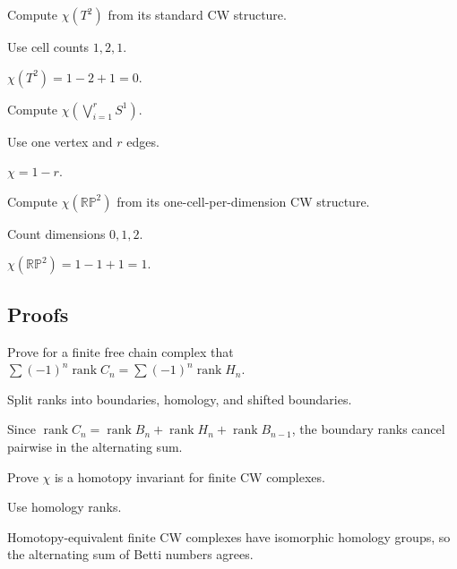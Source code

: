 \begin{exercise}[Torus]\label{exr:viii21-ped-03}
Compute $\chi(T^2)$ from its standard CW structure.
\end{exercise}
\begin{hint}
Use cell counts $1,2,1$.
\end{hint}
\begin{solution}
$\chi(T^2)=1-2+1=0$.
\end{solution}

\begin{exercise}\label{exr:viii21-ped-04}
Compute $\chi(\bigvee_{i=1}^r S^1)$.
\end{exercise}
\begin{hint}
Use one vertex and $r$ edges.
\end{hint}
\begin{solution}
$\chi=1-r$.
\end{solution}

\begin{exercise}\label{exr:viii21-ped-05}
Compute $\chi(\mathbb{RP}^2)$ from its one-cell-per-dimension CW structure.
\end{exercise}
\begin{hint}
Count dimensions $0,1,2$.
\end{hint}
\begin{solution}
$\chi(\mathbb{RP}^2)=1-1+1=1$.
\end{solution}

\subsection*{Proofs}

\begin{exercise}\label{exr:viii21-ped-06}
Prove for a finite free chain complex that $\sum(-1)^n\operatorname{rank}C_n=\sum(-1)^n\operatorname{rank}H_n$.
\end{exercise}
\begin{hint}
Split ranks into boundaries, homology, and shifted boundaries.
\end{hint}
\begin{solution}
Since $\operatorname{rank}C_n=\operatorname{rank}B_n+\operatorname{rank}H_n+\operatorname{rank}B_{n-1}$, the boundary ranks cancel pairwise in the alternating sum.
\end{solution}

\begin{exercise}\label{exr:viii21-ped-07}
Prove $\chi$ is a homotopy invariant for finite CW complexes.
\end{exercise}
\begin{hint}
Use homology ranks.
\end{hint}
\begin{solution}
Homotopy-equivalent finite CW complexes have isomorphic homology groups, so the alternating sum of Betti numbers agrees.
\end{solution}

